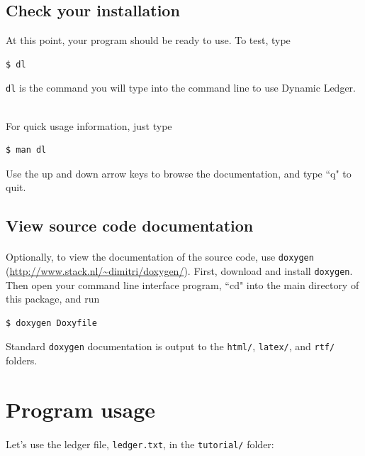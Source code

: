\documentclass{article}
\providecommand{\q}{$\quad$ \newline}
\begin{document}
\begin{flushleft}
\subsection{Check your installation}

At this point, your program should be ready to use. To test, type

\begin{lstlisting}
$ dl
\end{lstlisting}

{\tt dl} is the command you will type into the command line to use Dynamic Ledger. \q

For quick usage information, just type

\begin{lstlisting}
$ man dl
\end{lstlisting}

Use the up and down arrow keys to browse the documentation, and type ``q" to quit. 

\subsection{View source code documentation}

\paragraph{} Optionally, to view the documentation of the source code, use {\tt doxygen} (\url{http://www.stack.nl/~dimitri/doxygen/}). First, download and install {\tt doxygen}. Then open your command line interface program, ``cd" into the main directory of this package, and run

\begin{lstlisting}
$ doxygen Doxyfile
\end{lstlisting}

Standard {\tt doxygen} documentation is output to the {\tt html/}, {\tt latex/}, and {\tt rtf/} folders.


\section{Program usage}

\paragraph{} Let's use the ledger file, {\tt ledger.txt}, in the {\tt tutorial/} folder:


\end{flushleft}
\end{document}
